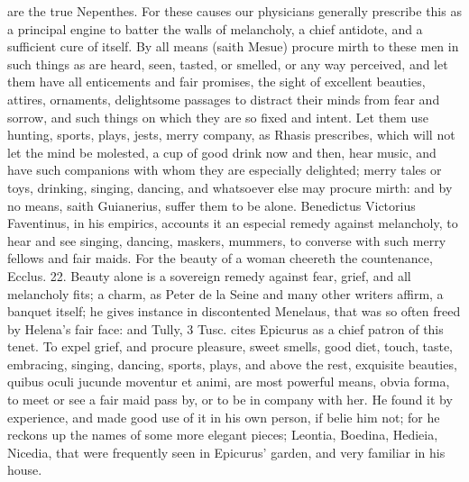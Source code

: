 {are the true Nepenthes. For these causes our physicians generally
prescribe this as a principal engine to batter the walls of melancholy,
a chief antidote, and a sufficient cure of itself. By all means (saith
 Mesue) procure mirth to these men in such things as are heard,
seen, tasted, or smelled, or any way perceived, and let them have all
enticements and fair promises, the sight of excellent beauties,
attires, ornaments, delightsome passages to distract their minds from
fear and sorrow, and such things on which they are so fixed and intent.
Let them use hunting, sports, plays, jests, merry company, as
Rhasis prescribes, which will not let the mind be molested, a cup of
good drink now and then, hear music, and have such companions with whom
they are especially delighted; merry tales or toys, drinking,
singing, dancing, and whatsoever else may procure mirth: and by no
means, saith Guianerius, suffer them to be alone. Benedictus Victorius
Faventinus, in his empirics, accounts it an especial remedy against
melancholy, to hear and see singing, dancing, maskers, mummers,
to converse with such merry fellows and fair maids. For the beauty of a
woman cheereth the countenance, Ecclus.  22.  Beauty alone
is a sovereign remedy against fear, grief, and all melancholy fits; a
charm, as Peter de la Seine and many other writers affirm, a banquet
itself; he gives instance in discontented Menelaus, that was so often
freed by Helena's fair face: and Tully, 3 Tusc. cites Epicurus as
a chief patron of this tenet. To expel grief, and procure pleasure,
sweet smells, good diet, touch, taste, embracing, singing, dancing,
sports, plays, and above the rest, exquisite beauties, quibus oculi
jucunde moventur et animi, are most powerful means, obvia forma, to
meet or see a fair maid pass by, or to be in company with her. He found
it by experience, and made good use of it in his own person, if
\Plutarch belie him not; for he reckons up the names of some more
elegant pieces; Leontia, Boedina, Hedieia, Nicedia, that were
frequently seen in Epicurus' garden, and very familiar in his house.

}
